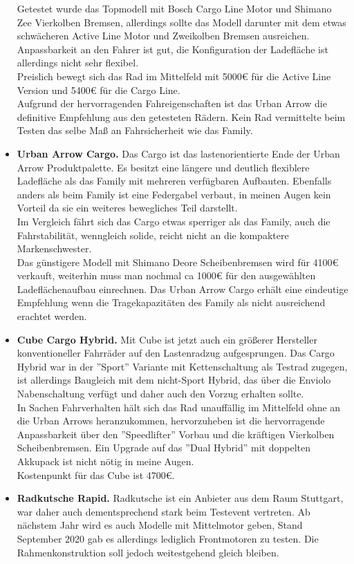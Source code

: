 \documentclass[a4paper,ngerman, 14pt] {scrartcl}
\begin{document}
\begin{itemize}
    Getestet wurde das Topmodell mit Bosch Cargo Line Motor und Shimano Zee Vierkolben Bremsen, allerdings sollte das Modell darunter mit dem etwas schwächeren Active Line Motor und Zweikolben Bremsen ausreichen. Anpassbarkeit an den Fahrer ist gut, die Konfiguration der Ladefläche ist allerdings nicht sehr flexibel.\\
    Preislich bewegt sich das Rad im Mittelfeld mit 5000€ für die Active Line Version und 5400€ für die Cargo Line.\\
    Aufgrund der hervorragenden Fahreigenschaften ist das Urban Arrow die definitive Empfehlung aus den getesteten Rädern. Kein Rad vermittelte beim Testen das selbe Maß an Fahrsicherheit wie das Family.
    \item  \textbf{Urban Arrow Cargo.} Das Cargo ist das lastenorientierte Ende der Urban Arrow Produktpalette. Es besitzt eine längere und deutlich flexiblere Ladefläche als das Family mit mehreren verfügbaren Aufbauten. Ebenfalls anders als beim Family ist eine Federgabel verbaut, in meinen Augen kein Vorteil da sie ein weiteres bewegliches Teil darstellt.\\
    Im Vergleich fährt sich das Cargo etwas sperriger als das Family, auch die Fahrstabilität, wenngleich solide, reicht nicht an die kompaktere Markenschwester.\\
    Das günstigere Modell mit Shimano Deore Scheibenbremsen wird für 4100€ verkauft, weiterhin muss man nochmal ca 1000€ für den ausgewählten Ladeflächenaufbau einrechnen. Das Urban Arrow Cargo erhält eine eindeutige Empfehlung wenn die Tragekapazitäten des Family als nicht ausreichend erachtet werden.
    \item \textbf{Cube Cargo Hybrid.} Mit Cube ist jetzt auch ein größerer Hersteller konventioneller Fahrräder auf den Lastenradzug aufgesprungen. Das Cargo Hybrid war in der ''Sport'' Variante mit Kettenschaltung als Testrad zugegen, ist allerdings Baugleich mit dem nicht-Sport Hybrid, das über die Enviolo Nabenschaltung verfügt und daher auch den Vorzug erhalten sollte.\\
    In Sachen Fahrverhalten hält sich das Rad unauffällig im Mittelfeld ohne an die Urban Arrows heranzukommen, hervorzuheben ist die hervorragende Anpassbarkeit über den ''Speedlifter'' Vorbau und die kräftigen Vierkolben Scheibenbremsen. Ein Upgrade auf das ''Dual Hybrid'' mit doppelten Akkupack ist nicht nötig in meine Augen.\\
    Kostenpunkt für das Cube ist 4700€.
    \item \textbf{Radkutsche Rapid.} Radkutsche ist ein Anbieter aus dem Raum Stuttgart, war daher auch dementsprechend stark beim Testevent vertreten. Ab nächstem Jahr wird es auch Modelle mit Mittelmotor geben, Stand September 2020 gab es allerdings lediglich Frontmotoren zu testen. Die Rahmenkonstruktion soll jedoch weitestgehend gleich bleiben.\\

\end{itemize}
\end{document}
